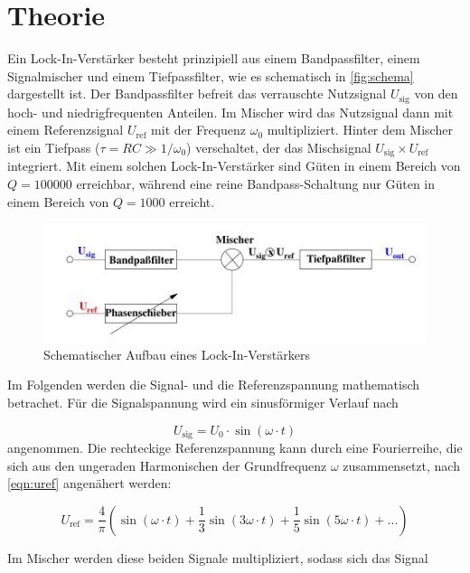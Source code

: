 \section{Theorie}
\label{sec:Theorie}
Ein Lock-In-Verstärker besteht prinzipiell aus einem Bandpassfilter, einem Signalmischer und einem Tiefpassfilter, wie es schematisch in \autoref{fig:schema} dargestellt ist. Der Bandpassfilter befreit das verrauschte Nutzsignal $U_\text{sig}$ von den hoch- und niedrigfrequenten Anteilen. Im Mischer wird das Nutzsignal dann mit einem Referenzsignal $U_\text{ref}$ mit der Frequenz $\omega_0$ multipliziert. Hinter dem Mischer ist ein Tiefpass ($\tau = RC ≫ 1/\omega_0$) verschaltet,  der das Mischsignal  $U_\text{sig} \times U_\text{ref}$ integriert. Mit einem solchen Lock-In-Verstärker sind Güten in einem Bereich von $Q=100000$ erreichbar, während eine reine Bandpass-Schaltung nur Güten in einem Bereich von $Q=1000$ erreicht.
\begin{figure}[H]
    \centering
    \includegraphics{images/schema.JPG}
    \caption{Schematischer Aufbau eines Lock-In-Verstärkers\cite{sample}}
    \label{fig:schema}
\end{figure}
\noindent
Im Folgenden werden die Signal- und die Referenzspannung mathematisch betrachet.
Für die Signalspannung wird ein sinusförmiger Verlauf nach  

\begin{equation}
    U_\text{sig} = U_0 \cdot \sin(\omega \cdot t)
    \label{eqn:usig}
\end{equation}
\noindent
angenommen.
Die rechteckige Referenzspannung kann durch eine Fourierreihe, die sich aus den ungeraden Harmonischen der Grundfrequenz $\omega$ zusammensetzt, nach \autoref{eqn:uref} angenähert werden:

\begin{equation}
    U_\text{ref} = \frac{4}{\pi}(\sin(\omega \cdot t) + \frac{1}{3}\sin(3\omega \cdot t) +  \frac{1}{5}\sin(5\omega \cdot t) + ...)
    \label{eqn:uref}
\end{equation}
\noindent

Im Mischer werden diese beiden Signale multipliziert, sodass sich das Signal 

